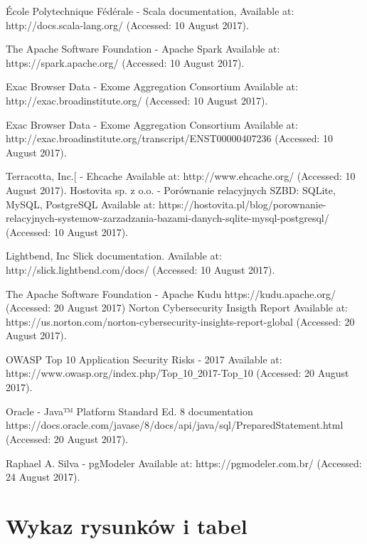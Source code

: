 \documentclass[a4paper,12pt,twoside]{article}
\begin{document}
\newpage
\begin{thebibliography}{99}

École Polytechnique Fédérale - Scala documentation,
Available at: http://docs.scala-lang.org/ (Accessed: 10 August 2017).

The Apache Software Foundation - Apache Spark Available at: https://spark.apache.org/ (Accessed: 10 August 2017).

Exac Browser Data - Exome Aggregation Consortium  
Available at: http://exac.broadinstitute.org/ (Accessed: 10 August 2017).

Exac Browser Data - Exome Aggregation Consortium  
Available at: http://exac.broadinstitute.org/transcript/ENST00000407236 (Accessed: 10 August 2017).

Terracotta, Inc.[ - Ehcache 
Available at: http://www.ehcache.org/ (Accessed: 10 August 2017).
Hostovita sp. z o.o. - Porównanie relacyjnych SZBD: SQLite, MySQL, PostgreSQL
Available at:
https://hostovita.pl/blog/porownanie-relacyjnych-systemow-zarzadzania-bazami-danych-sqlite-mysql-postgresql/ (Accessed: 10 August 2017).

Lightbend, Inc Slick documentation. Available at:
http://slick.lightbend.com/docs/ (Accessed: 10 August 2017).

The Apache Software Foundation - Apache Kudu
https://kudu.apache.org/ (Accessed: 20 August 2017)
Norton Cybersecurity Insigth Report 
Available at: https://us.norton.com/norton-cybersecurity-insights-report-global (Accessed: 20 August 2017).

OWASP Top 10 Application Security Risks - 2017 Available at: 
https://www.owasp.org/index.php/Top\verb!_!10\verb!_!2017-Top\verb!_!10 (Accessed: 20 August 2017).

Oracle - Java™ Platform Standard Ed. 8 documentation
https://docs.oracle.com/javase/8/docs/api/java/sql/PreparedStatement.html (Accessed: 20 August 2017).

Raphael A. Silva - pgModeler Available at: https://pgmodeler.com.br/
(Accessed: 24 August 2017).
\end{thebibliography}

\newpage
\section*{Wykaz rysunków i tabel}
\listoffigures
\listoftables
\end{document}

